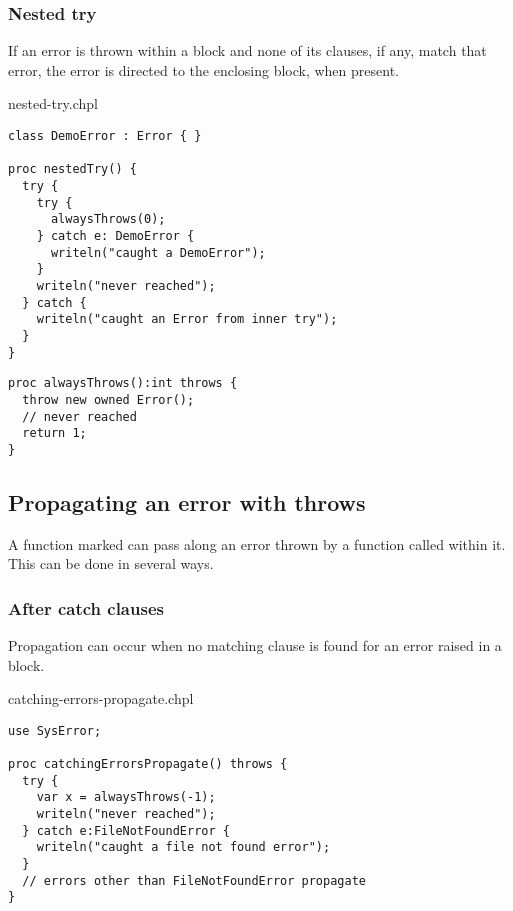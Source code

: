 \subsubsection{Nested try}
\label{Nested_try}

If an error is thrown within a  block and none of its
 clauses, if any, match that error, the error
is directed to the enclosing  block, when present.

\begin{chapelexample}{nested-try.chpl}
\begin{chapel}
\begin{verbatim}
class DemoError : Error { }

proc nestedTry() {
  try {
    try {
      alwaysThrows(0);
    } catch e: DemoError {
      writeln("caught a DemoError");
    }
    writeln("never reached");
  } catch {
    writeln("caught an Error from inner try");
  }
}
\end{verbatim}
\end{chapel}
\begin{chapelpost}
\begin{verbatim}
proc alwaysThrows():int throws {
  throw new owned Error();
  // never reached
  return 1;
}
\end{verbatim}
\end{chapelpost}
\end{chapelexample}

\subsection{Propagating an error with throws}
\label{Propagating_an_error_with_throws}

A function marked  can pass along an error thrown by a
function called within it. This can be done in several ways.

\subsubsection{After catch clauses}
\label{After_catch_clauses}

Propagation can occur when no matching  clause is found for an
error raised in a  block.

\begin{chapelexample}{catching-errors-propagate.chpl}
\begin{chapel}
\begin{verbatim}
use SysError;

proc catchingErrorsPropagate() throws {
  try {
    var x = alwaysThrows(-1);
    writeln("never reached");
  } catch e:FileNotFoundError {
    writeln("caught a file not found error");
  }
  // errors other than FileNotFoundError propagate
}
\end{verbatim}
\end{chapel}
\end{chapelexample}

